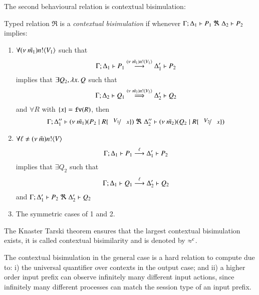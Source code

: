 The second behavioural relation is contextual bisimulation:
%
\begin{definition}\rm
	\label{def:context_bis}
	Typed relation 
	$\Re$ is a {\em contextual bisimulation} if whenever
	$\horel{\Gamma}{\Delta_1}{P_1}{\ \Re\ }{\Delta_2}{P_2}$ implies:
	\begin{enumerate}
		\item	$\forall (\nu\ \tilde{m_1}) n ! \langle V_1 \rangle$ such that
			\[
				\Gamma; \Delta_1 \vdash P_1 \stackrel{(\nu\ \tilde{m_1}) n ! \langle V_1 \rangle}{\longrightarrow} \Delta_1' \vdash P_2
			\]
			implies that $\exists Q_2, \lambda x.\,Q$ such that
			\[
				\Gamma; \Delta_2 \vdash Q_1 \stackrel{(\nu\ \tilde{m_2}) n ! \langle V_2 \rangle}{\Longrightarrow} \Delta_2' \vdash Q_2
			\]
			and $\forall R$ with $\{x\} = \mathtt{fv}(R)$, 
			then
			\[
				\horel{\Gamma}{\Delta_1''}{\newsp{\tilde{m_1}}{P_2 \Par R\subst{V_1}{x}}}
				{\ \Re\ }
				{\Delta_2''}{\newsp{\tilde{m_2}}{Q_2 \Par R\subst{V_2}{x}}}
			\]
%
		\item	$\forall \ell \not= (\nu\ \tilde{m}) n ! \langle V \rangle$
			\[
				\Gamma; \Delta_1 \vdash P_1 \stackrel{\ell}{\longrightarrow} \Delta_1' \vdash P_2
			\]
			implies that $\exists Q_2$ such that
			\[
				\Gamma; \Delta_1 \vdash Q_1 \stackrel{\ell}{\longrightarrow} \Delta_2' \vdash Q_2
			\]
			and
			$\horel{\Gamma}{\Delta_1'}{P_2}{\ \Re\ }{\Delta_2'}{Q_2}$

		\item	The symmetric cases of 1 and 2.
	\end{enumerate}
%
	The Knaster Tarski theorem ensures that the largest contextual bisimulation exists,
	it is called contextual bisimilarity and is denoted by $\approx^{c}$.
\end{definition}

The contextual bisimulation in the general case
is a hard relation to compute due to:
i) the universal quantifier over contexts in the output case;
and
ii) a higher order input prefix can observe infinitely many
different input actions, since infinitely many different
processes can match the session type of an input prefix.



